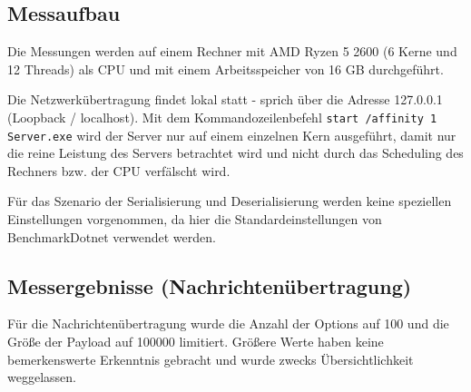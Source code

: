 \subsection{Messaufbau}
\label{subsec:messaufbau}

Die Messungen werden auf einem Rechner mit AMD Ryzen 5 2600 (6 Kerne und 12 Threads) als CPU und mit einem Arbeitsspeicher von 16 GB durchgeführt.

Die Netzwerkübertragung findet lokal statt - sprich über die Adresse 127.0.0.1 (Loopback / localhost). Mit dem Kommandozeilenbefehl \texttt{start /affinity 1 Server.exe} wird der Server nur auf einem einzelnen Kern ausgeführt, damit nur die reine Leistung des Servers betrachtet wird und nicht durch das Scheduling des Rechners bzw. der CPU verfälscht wird.

Für das Szenario der Serialisierung und Deserialisierung werden keine speziellen Einstellungen vorgenommen, da hier die Standardeinstellungen von BenchmarkDotnet verwendet werden.

\subsection{Messergebnisse (Nachrichtenübertragung)}
\label{subsec:messergebnisse-nachrichtenuebertragung}

Für die Nachrichtenübertragung wurde die Anzahl der Options auf 100 und die Größe der Payload auf 100000 limitiert. Größere Werte haben keine bemerkenswerte Erkenntnis gebracht und wurde zwecks Übersichtlichkeit weggelassen.

\begin{table}[h]
    \caption{Asynchrone Übertragung mit 100 Options und mit einer Payload von 100 Bytes.}
    \label{tab:asynchrone-uebertragung-100-100}
\end{table}


